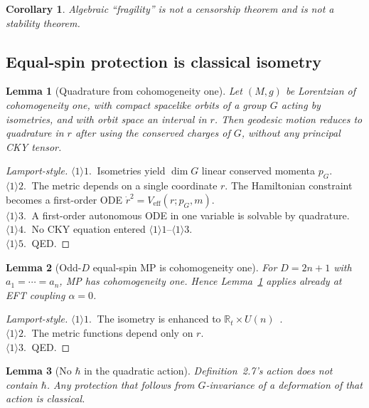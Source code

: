\documentclass[11pt,a4paper]{article}
\newtheorem{lemma}{Lemma}[section]
\newtheorem{corollary}{Corollary}[section]
\begin{document}
\begin{corollary}
Algebraic ``fragility'' is not a censorship theorem and is not a
stability theorem.
\end{corollary}

\subsection{Equal-spin protection is classical isometry}

\begin{lemma}[Quadrature from cohomogeneity one]
\label{lem:quad}
Let \((M,g)\) be Lorentzian of cohomogeneity one, with compact spacelike
orbits of a group \(G\) acting by isometries, and with orbit space an
interval in \(r\). Then geodesic motion reduces to quadrature in \(r\)
after using the conserved charges of \(G\), without any principal CKY
tensor.
\end{lemma}

\begin{proof}[Lamport-style]
\(\langle1\rangle1.\ \) Isometries yield \(\dim G\) linear conserved
momenta \(p_G\).\\
\(\langle1\rangle2.\ \) The metric depends on a single coordinate \(r\).
The Hamiltonian constraint becomes a first-order ODE
\(\dot r^2=V_{\mathrm{eff}}(r;p_G,m)\).\\
\(\langle1\rangle3.\ \) A first-order autonomous ODE in one variable is
solvable by quadrature.\\
\(\langle1\rangle4.\ \) No CKY equation entered
\(\langle1\rangle1\)--\(\langle1\rangle3\).\\
\(\langle1\rangle5.\ \) QED.
\end{proof}

\begin{lemma}[Odd-\(D\) equal-spin MP is cohomogeneity one]
\label{lem:odd}
For \(D=2n+1\) with \(a_1=\cdots=a_n\), MP has cohomogeneity one.
Hence Lemma~\ref{lem:quad} applies already at EFT coupling \(\alpha=0\).
\end{lemma}

\begin{proof}[Lamport-style]
\(\langle1\rangle1.\ \) The isometry is enhanced to
\(\mathbb{R}_t\times U(n)\)~\cite{GibbonsLuPagePope2004}.\\
\(\langle1\rangle2.\ \) The metric functions depend only on \(r\).\\
\(\langle1\rangle3.\ \) QED.
\end{proof}

\begin{lemma}[No \(\hbar\) in the quadratic action]
\label{lem:hbar}
Definition~2.7's action does not contain \(\hbar\). Any protection that
follows from \(G\)-invariance of a deformation of that action is
classical.
\end{lemma}
\end{document}
